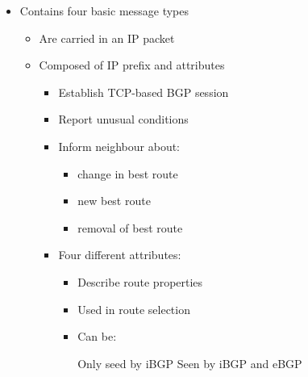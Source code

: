 \begin{itemize}
\begin{itemize}
\begin{itemize}
                    \item Contains four basic message types
                        \begin{itemize}
                            \item Are carried in an IP packet
                            \item Composed of IP prefix and attributes
                                \begin{itemize}
                                    \item Establish TCP-based BGP session
                                \end{itemize}
                                \begin{itemize}
                                    \item Report unusual conditions
                                \end{itemize}
                                \begin{itemize}
                                    \item Inform neighbour about:
                                        \begin{itemize}
                                            \item change in best route
                                            \item new best route
                                            \item removal of best route
                                        \end{itemize}
                                    \item Four different attributes:
                                        \begin{itemize}
                                            \item Describe route properties
                                            \item Used in route selection
                                            \item Can be:
                                                \begin{itemize}
                                                     Only seed by iBGP
                                                     Seen by iBGP and eBGP

\end{itemize}
\end{itemize}
\end{itemize}
\end{itemize}
\end{itemize}
\end{itemize}
\end{itemize}

